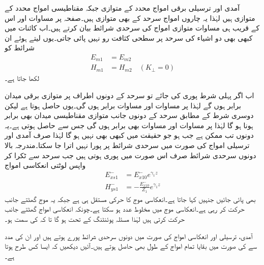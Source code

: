 آمدی اور ترسیلی برقی امواج  محدد کے متوازی جبکہ مقناطیسی امواج  محدد کے متوازی ہیں لہٰذا یہ چاروں امواج سرحد کے بھی متوازی ہیں۔صفحہ  پر مساوات  اور اس کے قریب ہی مساوات  متوازی امواج کی سرحدی شرائط بیان کرتے ہیں۔اب کائنات میں کبھی بھی دو اشیاء کی سرحد پر سطحی کثافت رو نہیں پائی جاتی۔یوں  لیتے ہوئے ان شرائط کو
\begin{align*}
E_{m1}&=E_{m2}\\
H_{m1}&=H_{m2} \quad(K_\perp=0)
\end{align*}
لکھا جاتا ہے۔

اب اگر پہلی شرط پوری کی جائے تو سرحد کے دونوں اطراف پر متوازی برقی میدان برابر ہوں گے  لہٰذا  پر مساوات  اور مساوات  برابر ہوں گی۔یوں  حاصل ہوتا ہے لیکن دوسری شرط کے مطابق سرحد کے دونوں جانب متوازی مقناطیسی میدان بھی برابر ہونا ہو گا لہٰذا  پر مساوات  اور مساوات  بھی برابر ہوں گی جس سے  حاصل ہوتی ہے۔یہ دونوں تب ممکن ہے جب  ہو جو حقیقت میں کبھی بھی نہیں ہو گا لہٰذا صرف آمدی اور ترسیلی امواج کی صورت میں سرحدی شرائط پر پورا نہیں اترا جا سکتا۔مندرجہ بالا دونوں سرحدی شرائط صرف اس صورت میں پوری ہوتی ہیں جب سرحد سے ٹکرا کر واپس لوٹتی انعکاسی امواج
\begin{align}
E_{xs1}^-&=E_{x10}^-e^{\gamma_1 z}\\
H_{ys1}^-&=-\frac{E_{x10}^-}{Z_1} e^{\gamma_1 z}
\end{align}
 بھی پائی جائیں جنہیں  کہا جاتا ہے۔انعکاسی موج کا  حرکی مستقل  ہی ہے جبکہ یہ موج  گھٹتے  جانب حرکت کر رہی ہے۔انعکاسی موج میں  مخلوط عدد ہو سکتا ہے۔چونکہ انعکاسی امواج گھٹتے  جانب حرکت کرتی ہیں لہٰذا مسئلہ پوئنٹنگ کے تحت  ہو گا تا کہ  کی سمت  ہو۔

آمدی، ترسیلی اور انعکاسی امواج کی صورت میں دونوں سرحدی شرائط پورے ہوتے ہیں اور ان کی مدد سے  کی صورت میں بقایا تمام امواج کے طول بھی حاصل ہوتے ہیں۔آئیں دیکھیں کہ ایسا کس طرح ہوتا ہے۔

